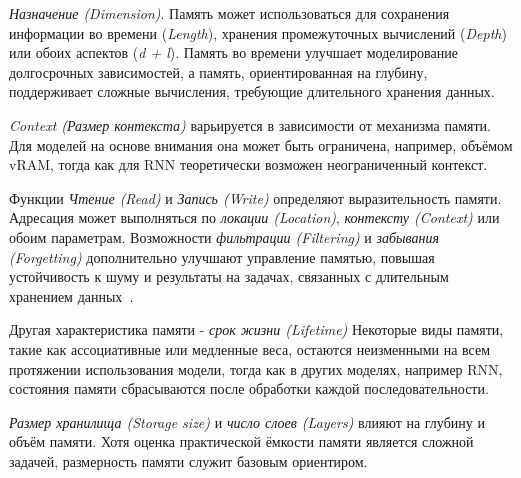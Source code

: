 \textit{Назначение (Dimension)}. Память может использоваться для сохранения информации во времени (\textit{Length}), хранения промежуточных вычислений (\textit{Depth}) или обоих аспектов (\textit{d + l}). Память во времени улучшает моделирование долгосрочных зависимостей, а память, ориентированная на глубину, поддерживает сложные вычисления, требующие длительного хранения данных.  

\textit{Context (Размер контекста)} варьируется в зависимости от механизма памяти. Для моделей на основе внимания она может быть ограничена, например, объёмом vRAM, тогда как для RNN теоретически возможен неограниченный контекст.  

Функции \textit{Чтение (Read)} и \textit{Запись (Write)} определяют выразительность памяти. Адресация может выполняться по \textit{локации (Location)}, \textit{контексту (Context)} или обоим параметрам. Возможности \textit{фильтрации (Filtering)} и \textit{забывания (Forgetting)} дополнительно улучшают управление памятью, повышая устойчивость к шуму и результаты на задачах, связанных с длительным хранением данных~\cite{gu2023mamba}.  

Другая характеристика памяти - \textit{срок жизни (Lifetime)} Некоторые виды памяти, такие как ассоциативные или медленные веса, остаются неизменными на всем протяжении использования модели, тогда как в других моделях, например RNN, состояния памяти сбрасываются после обработки каждой последовательности.

\textit{Размер хранилища (Storage size)} и \textit{число слоев (Layers)} влияют на глубину и объём памяти. Хотя оценка практической ёмкости памяти является сложной задачей, размерность памяти служит базовым ориентиром.  


